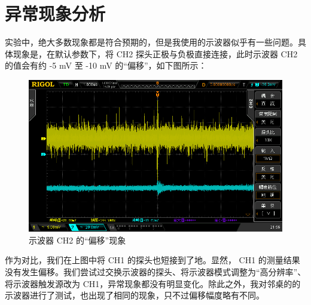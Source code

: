 \documentclass[UTF8]{article}
\begin{document}
\section{异常现象分析}

实验中，绝大多数现象都是符合预期的，但是我使用的示波器似乎有一些问题。具体现象是，在默认参数下，将 CH2 探头正极与负极直接连接，此时示波器 CH2 的值会有约 -5 mV 至 -10 mV 的“偏移”，如下图所示：

\begin{figure}[H]\centering
    \includegraphics[width=\columnwidth]{LCE-01-二极管/assets/异常分析/示波器 CH2 的偏移现象.png}
    \caption{示波器 CH2 的“偏移”现象}
\end{figure}

作为对比，我们在上图中将 CH1 的探头也短接到了地。显然， CH1 的测量结果没有发生偏移。我们尝试过交换示波器的探头、将示波器模式调整为“高分辨率”、将示波器触发源改为 CH1，异常现象都没有明显变化。除此之外，我对邻桌的的示波器进行了测试，也出现了相同的现象，只不过偏移幅度略有不同。
\end{document}
